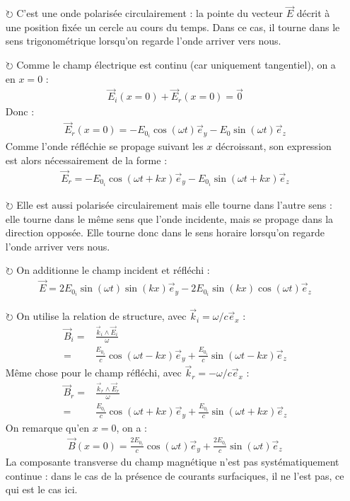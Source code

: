 \documentclass{report}
\begin{document}
\begin{itemize}

	\item[$\circlearrowright$] C'est une onde polarisée circulairement : la pointe du vecteur $\vec{E}$ décrit à une position fixée un cercle au cours du temps. Dans ce cas, il tourne dans le sens trigonométrique lorsqu'on regarde l'onde arriver vers nous. 
	
	\item[$\circlearrowright$] Comme le champ électrique est continu (car uniquement tangentiel), on a en $x=0$ :
	\begin{align*}
		\vec{E}_i(x=0)+\vec{E}_r(x=0)=\vec{0}
	\end{align*}
	Donc :
	\begin{align*}
		\vec{E}_r(x=0)=-E_{0_i}\cos(\omega t)\vec{e}_y-E_0\sin(\omega t)\vec{e}_z
	\end{align*}	
	Comme l'onde réfléchie se propage suivant les $x$ décroissant, son expression est alors nécessairement de la forme :
	\begin{align*}
		\vec{E}_r=-E_{0_i}\cos(\omega t+kx)\vec{e}_y-E_{0_i}\sin(\omega t +kx)\vec{e}_z
	\end{align*}	
	
	\item[$\circlearrowright$] Elle est aussi polarisée circulairement mais elle tourne dans l'autre sens : elle tourne dans le même sens que l'onde incidente, mais se propage dans la direction opposée. Elle tourne donc dans le sens horaire lorsqu'on regarde l'onde arriver vers nous. 
	
	\item[$\circlearrowright$] On additionne le champ incident et réfléchi : 
	\begin{align*}
		\vec{E}=2E_{0_i}\sin(\omega t)\sin(kx)\vec{e}_y-2E_{0_i}\sin(kx)\cos(\omega t)\vec{e}_z
	\end{align*}
	\item[$\circlearrowright$] On utilise la relation de structure, avec $\vec{k}_i=\omega/c\vec{e}_x$ :
	\begin{align*}
		\vec{B}_i=&\frac{\vec{k}_i\wedge\vec{E}_i}{\omega} \\
		=&\frac{E_{0_i}}{c}\cos(\omega t -kx)\vec{e}_y+\frac{E_{0_i}}{c}\sin(\omega t -kx)\vec{e}_z
	\end{align*}
	Même chose pour le champ réfléchi, avec $\vec{k}_r=-\omega/c\vec{e}_x$ :
	\begin{align*}
		\vec{B}_r=&\frac{\vec{k}_r\wedge\vec{E}_r}{\omega} \\
		=&\frac{E_{0_i}}{c}\cos(\omega t +kx)\vec{e}_y+\frac{E_{0_i}}{c}\sin(\omega t +kx)\vec{e}_z
	\end{align*}
	On remarque qu'en $x=0$, on a :
	\begin{align*}
		\vec{B}(x=0)=\frac{2E_{0_i}}{c}\cos(\omega t)\vec{e}_y+\frac{2E_{0_i}}{c}\sin(\omega t)\vec{e}_z
	\end{align*}
	La composante transverse du champ magnétique n'est pas systématiquement continue : dans le cas de la présence de courants surfaciques, il ne l'est pas, ce qui est le cas ici.

\end{itemize}
\end{document}
